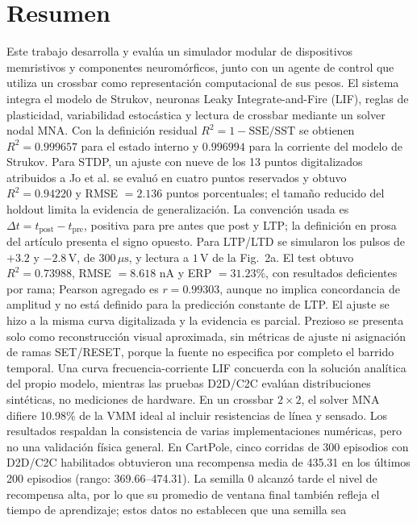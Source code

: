 \chapter*{Resumen}

Este trabajo desarrolla y evalúa un simulador modular de dispositivos
memristivos y componentes neuromórficos, junto con un agente de control
que utiliza un crossbar como representación computacional de sus pesos.
El sistema integra el modelo de Strukov, neuronas Leaky Integrate-and-Fire
(LIF), reglas de plasticidad, variabilidad estocástica y lectura de
crossbar mediante un solver nodal MNA. Con la definición residual $R^2=1-\mathrm{SSE}/\mathrm{SST}$ se obtienen
$R^2=0.999657$ para el estado interno y $0.996994$ para la corriente del
modelo de Strukov. Para STDP, un ajuste con nueve de los 13 puntos
digitalizados atribuidos a Jo et al. se evaluó en cuatro puntos
reservados y obtuvo $R^2=0.94220$ y RMSE $=2.136$ puntos porcentuales;
el tamaño reducido del holdout limita la evidencia de generalización.
La convención usada es $\Delta t=t_{\mathrm{post}}-t_{\mathrm{pre}}$,
positiva para pre antes que post y LTP; la definición en prosa del
artículo presenta el signo opuesto. Para LTP/LTD se simularon los pulsos
de $+3.2$ y $-2.8\,\mathrm{V}$, de $300\,\mu\mathrm{s}$, y lectura a
$1\,\mathrm{V}$ de la Fig.~2a. El test obtuvo $R^2=0.73988$,
RMSE $=8.618$ nA y ERP $=31.23\%$, con resultados deficientes por rama;
Pearson agregado es $r=0.99303$, aunque no implica concordancia de
amplitud y no está definido para la predicción constante de LTP. El
ajuste se hizo a la misma curva digitalizada y la evidencia es parcial.
Prezioso se presenta solo como reconstrucción visual aproximada,
sin métricas de ajuste ni asignación de ramas SET/RESET, porque la fuente
no especifica por completo el barrido temporal. Una curva
frecuencia-corriente LIF concuerda con la solución analítica del propio
modelo, mientras las pruebas D2D/C2C evalúan distribuciones sintéticas,
no mediciones de hardware. En un crossbar $2\times2$, el solver MNA
difiere 10.98\% de la VMM ideal al incluir resistencias de línea y
sensado. Los resultados respaldan la consistencia de varias
implementaciones numéricas, pero no una validación física general. En
CartPole, cinco corridas de 300 episodios con D2D/C2C habilitados
obtuvieron una recompensa media de 435.31 en los últimos 200 episodios
(rango: 369.66--474.31). La semilla 0 alcanzó tarde el nivel de
recompensa alta, por lo que su promedio de ventana final también refleja
el tiempo de aprendizaje; estos datos no establecen que una semilla sea
